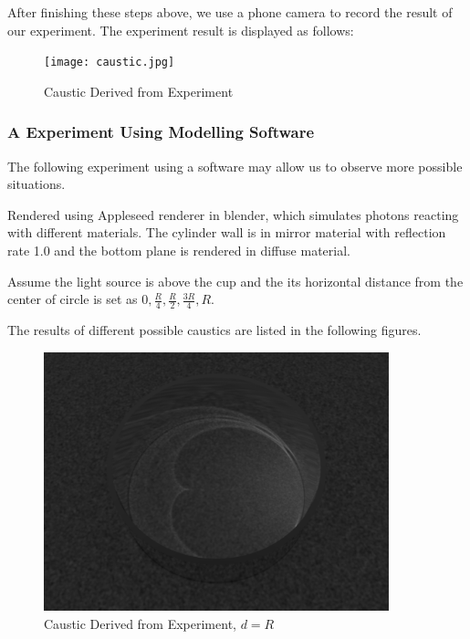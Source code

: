 \documentclass[a4paper]{article}
\begin{document}
    After finishing these steps above, we use a phone camera to record the result of our experiment. The experiment result is displayed as follows:
    
    \begin{figure}[!htbp]
        \centering
        \texttt{[image: caustic.jpg]}
        \caption{Caustic Derived from Experiment}
        \label{fig:caustic}
    \end{figure}

\subsubsection{A Experiment Using Modelling Software}
The following experiment using a software may allow us to observe more possible situations. 

Rendered using Appleseed renderer in blender, which simulates photons reacting with different materials. The cylinder wall is in mirror material with reflection rate 1.0 and the bottom plane is rendered in diffuse material.

Assume the light source is above the cup and the its horizontal distance from the center of circle is set as $0,\frac{R}{4},\frac{R}{2},\frac{3R}{4},R$.

The results of different possible caustics are listed in the following figures.

    \begin{figure}[!htbp]
        \centering
        \includegraphics[width=10cm]{0001.png}
        \caption{Caustic Derived from Experiment, $d=R$}
        \label{fig:caustic}
    \end{figure}
    
\end{document}
